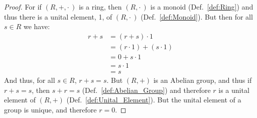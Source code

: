     \begin{proof}
        For if $(R,+,\cdot\,)$ is a ring, then $(R,\cdot\,)$ is a monoid
        (Def.~\ref{def:Ring}) and thus there is a unital element, 1, of
        $(R,\cdot\,)$ (Def.~\ref{def:Monoid}). But then for all $s\in{R}$
        we have:
        \begin{align}
            r+s&=(r+s)\cdot{1}
            \tag{Identity Property of 1}\\
            &=(r\cdot{1})+(s\cdot{1})
            \tag{Distributive Property}\\
            &=0+s\cdot{1}
            \tag{Hypothesis}\\
            &=s\cdot{1}
            \tag{Identity Property of 0}\\
            &=s
            \tag{Identity Property of 1}
        \end{align}
        And thus, for all $s\in{R}$, $r+s=s$. But $(R,+)$ is an Abelian group,
        and thus if $r+s=s$, then $s+r=s$ (Def.~\ref{def:Abelian_Group}) and
        therefore $r$ is a unital element of $(R,+)$
        (Def.~\ref{def:Unital_Element}). But the unital element of a group is
        unique, and therefore $r=0$.
    \end{proof}

